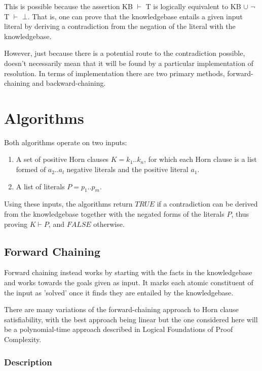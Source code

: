 \documentclass{article}
\begin{document}
This is possible because the assertion KB $\vdash$ T is logically equivalent to
KB $\cup$ $\neg$T $\vdash$ $\bot$. That is, one can prove that the knowledgebase
entails a given input literal by deriving a contradiction from the negation of
the literal with the knowledgebase.

However, just because there is a potential route to the contradiction possible,
doesn't necessarily mean that it will be found by a particular implementation of
resolution. In terms of implementation there are two primary methods, 
forward-chaining and backward-chaining.

\section{Algorithms}

Both algorithms operate on two inputs:

\begin{enumerate}
  \item A set of positive Horn clauses $K = k_1 .. k_n$, for which each Horn
  clause is a list formed of $a_2 .. a_l$ negative literals and the positive 
  literal $a_1$. 
  \item A list of literals $P = p_1 .. p_m$.
\end{enumerate}

Using these inputs, the algorithms return $TRUE$ if a contradiction can be derived
from the knowledgebase together with the negated forms of the literals $P$, thus proving
$K \vdash P$, and $FALSE$ otherwise.

\subsection{Forward Chaining}

Forward chaining instead works by starting with the facts in the knowledgebase
and works towards the goals given as input. It marks each atomic constituent of
the input as 'solved' once it finds they are entailed by the knowledgebase.

There are many variations of the forward-chaining approach to Horn clause
satisfiability, with the best approach being linear\cite{linforward} but the 
one considered here will be a polynomial-time approach described in Logical 
Foundations of Proof Complexity.\cite{proofcomp}

\subsubsection{Description}
\end{document}
